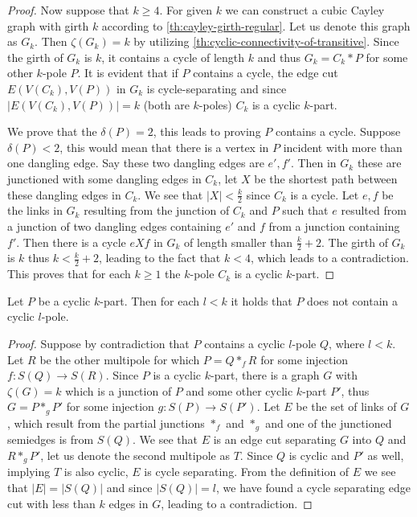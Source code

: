 \documentclass[12pt, twoside]{book}
\begin{document}
\begin{proof}
	Now suppose that $k\geq 4$. For given $k$ we can construct a cubic Cayley graph with girth $k$ according to \cref{th:cayley-girth-regular}. Let us denote this graph as $G_k$. Then $\zeta(G_k)=k$ by utilizing \cref{th:cyclic-connectivity-of-transitive}. Since the girth of $G_k$ is $k$, it contains a cycle of length $k$ and thus $G_k=C_k*P$ for some other $k$-pole $P$. It is evident that if $P$ contains a cycle, the edge cut $E(V(C_k), V(P))$ in $G_k$ is cycle-separating and since $|E(V(C_k), V(P))|=k$ (both are $k$-poles) $C_k$ is a cyclic $k$-part.
	
	We prove that the $\delta(P)=2$, this leads to proving $P$ contains a cycle. Suppose $\delta(P)<2$, this would mean that there is a vertex in $P$ incident with more than one dangling edge. Say these two dangling edges are $e',f'$. Then in $G_k$ these are junctioned with some dangling edges in $C_k$, let $X$ be the shortest path between these dangling edges in $C_k$. We see that $|X|<\frac{k}{2}$ since $C_k$ is a cycle. Let $e,f$ be the links in $G_k$ resulting from the junction of $C_k$ and $P$ such that $e$ resulted from a junction of two dangling edges containing $e'$ and $f$ from a junction containing $f'$. Then there is a cycle $eXf$ in $G_k$ of length smaller than $\frac{k}{2}+2$. The girth of $G_k$ is $k$ thus $k<\frac{k}{2}+2$, leading to the fact that $k<4$, which leads to a contradiction. This proves that for each $k\geq 1$ the $k$-pole $C_k$ is a cyclic $k$-part.
\end{proof}

\begin{lemma}\label{lem:cyclic-part-no-small-cyclic-l-pole}
	Let $P$ be a cyclic $k$-part. Then for each $l<k$ it holds that $P$ does not contain a cyclic $l$-pole.
\end{lemma}

\begin{proof}
	Suppose by contradiction that $P$ contains a cyclic $l$-pole $Q$, where $l<k$. Let $R$ be the other multipole for which $P=Q*_fR$ for some injection $f:S(Q)\rightarrow S(R)$. Since $P$ is a cyclic $k$-part, there is a graph $G$ with $\zeta(G)=k$ which is a junction of $P$ and some other cyclic $k$-part $P'$, thus $G=P*_gP'$ for some injection $g:S(P)\rightarrow S(P')$. Let $E$ be the set of links of $G$, which result from the partial junctions $*_f$ and $*_g$ and one of the junctioned semiedges is from $S(Q)$. We see that $E$ is an edge cut separating $G$ into $Q$ and $R*_gP'$, let us denote the second multipole as $T$. Since $Q$ is cyclic and $P'$ as well, implying $T$ is also cyclic, $E$ is cycle separating. From the definition of $E$ we see that $|E|=|S(Q)|$ and since $|S(Q)|=l$, we have found a cycle separating edge cut with less than $k$ edges in $G$, leading to a contradiction.
\end{proof}
\end{document}
